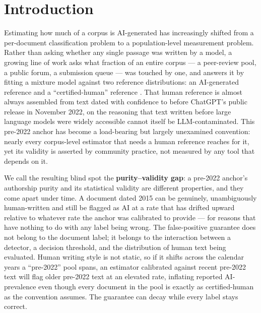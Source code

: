 \documentclass[conference]{IEEEtran}
\begin{document}
\section{Introduction}\label{sec:intro}

Estimating how much of a corpus is AI-generated has increasingly shifted from a per-document classification problem to a population-level measurement problem. Rather than asking whether any single passage was written by a model, a growing line of work asks what fraction of an entire corpus --- a peer-review pool, a public forum, a submission queue --- was touched by one, and answers it by fitting a mixture model against two reference distributions: an AI-generated reference and a ``certified-human'' reference \cite{MonitorAIScale}. That human reference is almost always assembled from text dated with confidence to before ChatGPT's public release in November 2022, on the reasoning that text written before large language models were widely accessible cannot itself be LLM-contaminated. This pre-2022 anchor has become a load-bearing but largely unexamined convention: nearly every corpus-level estimator that needs a human reference reaches for it, yet its validity is asserted by community practice, not measured by any tool that depends on it.

We call the resulting blind spot the \textbf{purity--validity gap}: a pre-2022 anchor's authorship purity and its statistical validity are different properties, and they come apart under time. A document dated 2015 can be genuinely, unambiguously human-written and still be flagged as AI at a rate that has drifted upward relative to whatever rate the anchor was calibrated to provide --- for reasons that have nothing to do with any label being wrong. The false-positive guarantee does not belong to the document label; it belongs to the interaction between a detector, a decision threshold, and the distribution of human text being evaluated. Human writing style is not static, so if it shifts across the calendar years a ``pre-2022'' pool spans, an estimator calibrated against recent pre-2022 text will flag older pre-2022 text at an elevated rate, inflating reported AI-prevalence even though every document in the pool is exactly as certified-human as the convention assumes. The guarantee can decay while every label stays correct.
\end{document}
